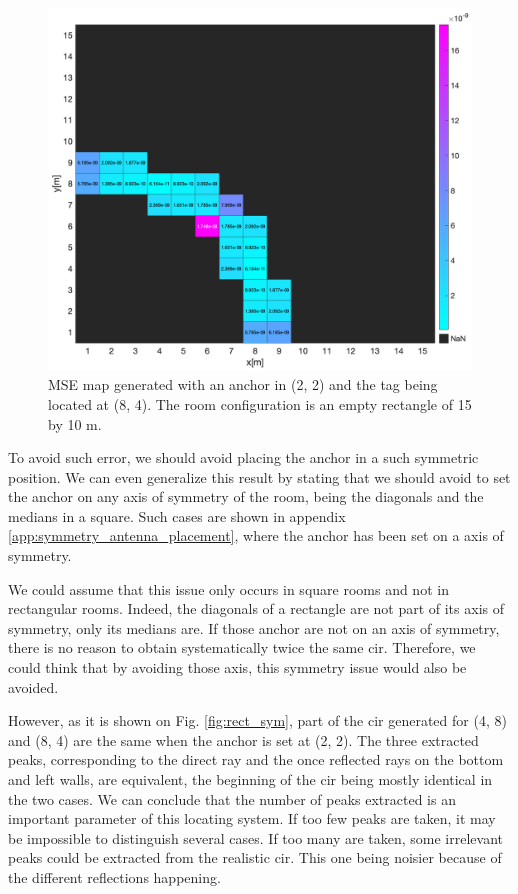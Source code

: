 \begin{figure}[H]
\centering
\includegraphics[width=.9\linewidth]{Images/square_sym_mse_4_8.png}
\caption{MSE map generated with an anchor in (2, 2) and the tag being located at (8, 4). The room configuration is an empty rectangle of 15 by 10 m.  \label{fig:square_sym_cir_comparison}}
\end{figure} 

To avoid such error, we should avoid placing the anchor in a such symmetric position. We can even generalize this result by stating that we should avoid to set the anchor on any axis of symmetry of the room, being the diagonals and the medians in a square. Such cases are shown in appendix \ref{app:symmetry_antenna_placement}, where the anchor has been set on a axis of symmetry.
\vspace{2mm}

We could assume that this issue only occurs in square rooms and not in rectangular rooms. Indeed, the diagonals of a rectangle are not part of its axis of symmetry, only its medians are. If those anchor are not on an axis of symmetry, there is no reason to obtain systematically twice the same \gls{cir}. Therefore, we could think that by avoiding those axis, this symmetry issue would also be avoided.
\vspace{2mm}

However, as it is shown on Fig. \ref{fig:rect_sym}, part of the \gls{cir} generated for (4, 8) and (8, 4) are the same when the anchor is set at (2, 2). The three extracted peaks, corresponding to the direct ray and the once reflected rays on the bottom and left walls, are equivalent, the beginning of the \gls{cir} being mostly identical in the two cases. We can conclude that the number of peaks extracted is an important parameter of this locating system. If too few peaks are taken, it may be impossible to distinguish several cases. If too many are taken, some irrelevant peaks could be extracted from the realistic \gls{cir}. This one being noisier because of the different reflections happening.

